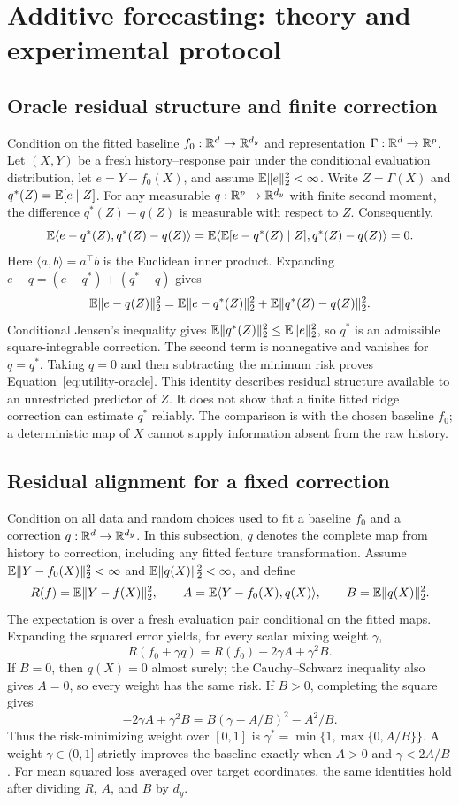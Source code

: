 \section{Additive forecasting: theory and experimental protocol}
\label{app:utility}

\subsection{Oracle residual structure and finite correction}
\label{app:utility-projection}
Condition on the fitted baseline $f_0:\mathbb{R}^d\to\mathbb{R}^{d_y}$ and
representation $\Gamma:\mathbb{R}^d\to\mathbb{R}^p$. Let $(X,Y)$ be a fresh
history--response pair under the conditional evaluation distribution,
let $e=Y-f_0(X)$, and assume $\mathbb{E}\|e\|_2^2<\infty$.
Write $Z=\Gamma(X)$ and $q^*(Z)=\mathbb{E}[e\mid Z]$. For any measurable
$q:\mathbb{R}^p\to\mathbb{R}^{d_y}$ with finite second moment, the difference
$q^*(Z)-q(Z)$ is measurable with respect to $Z$. Consequently,
\[
 \mathbb{E}\langle e-q^*(Z),q^*(Z)-q(Z)\rangle
 =\mathbb{E}\langle\mathbb{E}[e-q^*(Z)\mid Z],q^*(Z)-q(Z)\rangle=0.
\]
Here $\langle a,b\rangle=a^\top b$ is the Euclidean inner product.
Expanding $e-q=(e-q^*)+(q^*-q)$ gives
\[
 \mathbb{E}\|e-q(Z)\|_2^2
 =\mathbb{E}\|e-q^*(Z)\|_2^2+\mathbb{E}\|q^*(Z)-q(Z)\|_2^2.
\]
Conditional Jensen's inequality gives
$\mathbb{E}\|q^*(Z)\|_2^2\leq\mathbb{E}\|e\|_2^2$, so $q^*$ is an admissible
square-integrable correction. The second term is nonnegative and
vanishes for $q=q^*$. Taking $q=0$
and then subtracting the minimum risk proves
Equation~\eqref{eq:utility-oracle}. This identity describes residual
structure available to an unrestricted predictor of $Z$. It does not
show that a finite fitted ridge correction can estimate $q^*$ reliably.
The comparison is with the chosen baseline $f_0$; a deterministic map
of $X$ cannot supply information absent from the raw history.

\subsection{Residual alignment for a fixed correction}
\label{app:utility-alignment}
Condition on all data and random choices used to fit a baseline $f_0$
and a correction $q:\mathbb{R}^d\to\mathbb{R}^{d_y}$. In this subsection, $q$ denotes
the complete map from history to correction, including any fitted
feature transformation. Assume
$\mathbb{E}\|Y-f_0(X)\|_2^2<\infty$ and $\mathbb{E}\|q(X)\|_2^2<\infty$, and define
\[
 R(f)=\mathbb{E}\|Y-f(X)\|_2^2,\qquad
 A=\mathbb{E}\langle Y-f_0(X),q(X)\rangle,\qquad
 B=\mathbb{E}\|q(X)\|_2^2.
\]
The expectation is over a fresh evaluation pair conditional on the
fitted maps. Expanding the squared error yields, for every scalar
mixing weight $\gamma$,
\[
 R(f_0+\gamma q)=R(f_0)-2\gamma A+\gamma^2B.
\]
If $B=0$, then $q(X)=0$ almost surely; the Cauchy--Schwarz inequality
also gives $A=0$, so every weight has the same risk. If $B>0$, completing
the square gives
\[
 -2\gamma A+\gamma^2B=B(\gamma-A/B)^2-A^2/B.
\]
Thus the risk-minimizing weight over $[0,1]$ is
$\gamma^*=\min\{1,\max\{0,A/B\}\}$. A weight
$\gamma\in(0,1]$ strictly improves the baseline exactly when
$A>0$ and $\gamma<2A/B$. For mean squared loss averaged over target
coordinates, the same identities hold after dividing $R$, $A$, and
$B$ by $d_y$.

